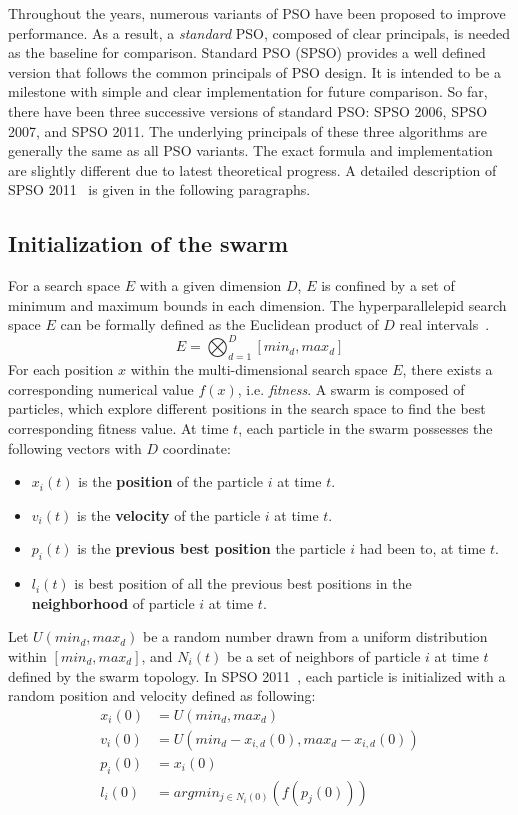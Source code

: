 Throughout the years, numerous variants of PSO have been proposed to improve performance.
As a result, a \textit{standard} PSO, composed of clear principals, is needed as the baseline for comparison.
Standard PSO (SPSO) provides a well defined version that follows the common principals of PSO design.
It is intended to be a milestone with simple and clear implementation for future comparison. %
So far, there have been three successive versions of standard PSO: SPSO 2006, SPSO 2007, and SPSO 2011.
The underlying principals of these three algorithms are generally the same as all PSO variants.
The exact formula and implementation are slightly different due to latest theoretical progress.
A detailed description of SPSO 2011~\cite{Zambrano:2013:SPSO2011} is given in the following paragraphs.

\subsection{Initialization of the swarm}

For a search space $E$ with a given dimension $D$, $E$ is confined by a set of minimum and maximum bounds in each dimension.
The hyperparallelepid search space $E$ can be formally defined as the Euclidean product of $D$ real intervals~\cite{Clerc:2012:SPSO2011}.
\begin{displaymath}
E = \bigotimes_{d=1}^{D}[min_d, max_d]
\end{displaymath}
For each position $x$ within the multi-dimensional search space $E$, there exists a corresponding numerical value $f(x)$, i.e. \textit{fitness}.
A swarm is composed of particles, which explore different positions in the search space to find the best corresponding fitness value.
At time $t$, each particle in the swarm possesses the following vectors with $D$ coordinate:
\begin{itemize}
\item $x_i(t)$ is the \textbf{position} of the particle $i$ at time $t$.
\item $v_i(t)$ is the \textbf{velocity} of the particle $i$ at time $t$.
\item $p_i(t)$ is the \textbf{previous best position} the particle $i$ had been to, at time $t$.
\item $l_i(t)$ is best position of all the previous best positions in the \textbf{neighborhood} of particle $i$ at time $t$.
\end{itemize}

Let $U(min_d, max_d)$ be a random number drawn from a uniform distribution within $[min_d, max_d]$, 
and $N_i(t)$ be a set of neighbors of particle $i$ at time $t$ defined by the swarm topology.
In SPSO 2011~\cite{Clerc:2012:SPSO2011}, each particle is initialized with a random position and velocity defined as following:
\begin{align*}
x_i(0) &= U(min_d, max_d) \\
v_i(0) &= U(min_d - x_{i,d}(0), max_d - x_{i,d}(0)) \\
p_i(0) &= x_i(0) \\ 
l_i(0) &= argmin_{j \in N_i(0)}(f(p_j(0)))
\end{align*}


